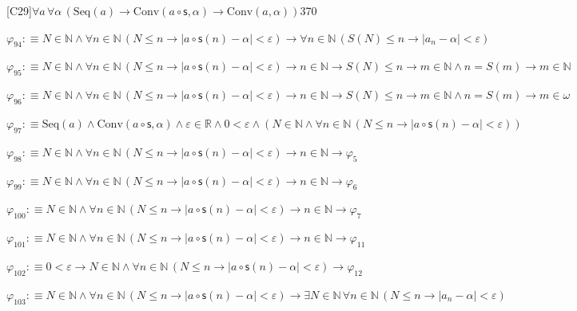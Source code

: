 \begin{fullproof}{[C29]}{$\forall a\,\forall \alpha\,(\mathrm{Seq}(a) \to \mathrm{Conv}(a \circ \mathsf{s},\alpha) \to \mathrm{Conv}(a,\alpha))$}{370}
\begin{abbrevlist}
\item $\varphi_{94} :\equiv N \in \mathbb{N} \land \forall n \in \mathbb{N}\,(N \leq n \to \lvert a \circ \mathsf{s}(n) - \alpha \rvert < \varepsilon) \to \forall n \in \mathbb{N}\,(S(N) \leq n \to \lvert a_{n} - \alpha \rvert < \varepsilon)$
\item $\varphi_{95} :\equiv N \in \mathbb{N} \land \forall n \in \mathbb{N}\,(N \leq n \to \lvert a \circ \mathsf{s}(n) - \alpha \rvert < \varepsilon) \to n \in \mathbb{N} \to S(N) \leq n \to m \in \mathbb{N} \land n = S(m) \to m \in \mathbb{N}$
\item $\varphi_{96} :\equiv N \in \mathbb{N} \land \forall n \in \mathbb{N}\,(N \leq n \to \lvert a \circ \mathsf{s}(n) - \alpha \rvert < \varepsilon) \to n \in \mathbb{N} \to S(N) \leq n \to m \in \mathbb{N} \land n = S(m) \to m \in \omega$
\item $\varphi_{97} :\equiv \mathrm{Seq}(a) \land \mathrm{Conv}(a \circ \mathsf{s},\alpha) \land \varepsilon \in \mathbb{R} \land 0 < \varepsilon \land (N \in \mathbb{N} \land \forall n \in \mathbb{N}\,(N \leq n \to \lvert a \circ \mathsf{s}(n) - \alpha \rvert < \varepsilon))$
\item $\varphi_{98} :\equiv N \in \mathbb{N} \land \forall n \in \mathbb{N}\,(N \leq n \to \lvert a \circ \mathsf{s}(n) - \alpha \rvert < \varepsilon) \to n \in \mathbb{N} \to \varphi_{5}$
\item $\varphi_{99} :\equiv N \in \mathbb{N} \land \forall n \in \mathbb{N}\,(N \leq n \to \lvert a \circ \mathsf{s}(n) - \alpha \rvert < \varepsilon) \to n \in \mathbb{N} \to \varphi_{6}$
\item $\varphi_{100} :\equiv N \in \mathbb{N} \land \forall n \in \mathbb{N}\,(N \leq n \to \lvert a \circ \mathsf{s}(n) - \alpha \rvert < \varepsilon) \to n \in \mathbb{N} \to \varphi_{7}$
\item $\varphi_{101} :\equiv N \in \mathbb{N} \land \forall n \in \mathbb{N}\,(N \leq n \to \lvert a \circ \mathsf{s}(n) - \alpha \rvert < \varepsilon) \to n \in \mathbb{N} \to \varphi_{11}$
\item $\varphi_{102} :\equiv 0 < \varepsilon \to N \in \mathbb{N} \land \forall n \in \mathbb{N}\,(N \leq n \to \lvert a \circ \mathsf{s}(n) - \alpha \rvert < \varepsilon) \to \varphi_{12}$
\item $\varphi_{103} :\equiv N \in \mathbb{N} \land \forall n \in \mathbb{N}\,(N \leq n \to \lvert a \circ \mathsf{s}(n) - \alpha \rvert < \varepsilon) \to \exists N \in \mathbb{N}\,\forall n \in \mathbb{N}\,(N \leq n \to \lvert a_{n} - \alpha \rvert < \varepsilon)$

\end{abbrevlist}
\end{fullproof}
